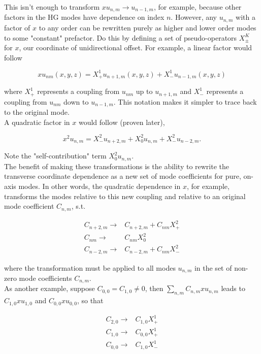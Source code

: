 \documentclass[aps,twoside,secnumarabic,balancelastpage,amsmath,amssymb,nofootinbib,hyperref=pdftex]{revtex4}
\begin{document}
This isn't enough to transform $x u_{n,m} \rightarrow u_{n-1,m}$, for example, because other factors in the HG modes have dependence on index $n$. However, any $u_{n,m}$ with a factor of $x$ to any order can be rewritten purely as higher and lower order modes to some "constant" prefactor. Do this by defining a set of pseudo-operators $X_\pm^K$ for $x$, our coordinate of unidirectional offset. For example, a linear factor would follow

\begin{equation}
x u_{nm} (x,y,z) = 
	X_+^1 u_{n+1,m}(x,y,z)
	+
	X_-^1 u_{n-1,m}(x,y,z) 
\end{equation}

where $X_+^1$ represents a coupling from $u_{nm}$ up to $u_{n+1,m}$ and $X_-^1$ represents a coupling from $u_{nm}$ down to $u_{n-1,m}$. This notation makes it simpler to trace back to the original mode. \\

A quadratic factor in $x$ would follow (proven later),

\begin{equation}
x^2 u_{n, m} =
	X_-^2 u_{n+2,m}
	+
	X_0^2 u_{n,m}
	+
	X_-^2 u_{n-2,m}	.
\end{equation}

Note the "self-contribution" term $X_0^2 u_{n,m}$.\\

The benefit of making these transformations is the ability to rewrite the transverse coordinate dependence as a new set of mode coefficients for pure, on-axis modes. In other words, the quadratic dependence in $x$, for example, transforms the modes relative to this new coupling and relative to an original mode coefficient $C_{n,m}$, s.t. 

\begin{align*}
C_{n+2,m} \rightarrow &C_{n+2,m} + C_{nm}X_+^2
\\
C_{nm} \rightarrow & C_{nm}X_0^2
\\
C_{n-2,m} \rightarrow & C_{n-2,m} + C_{nm}X_-^2
\end{align*}

where the transformation must be applied to all modes $u_{n,m}$ in the set of non-zero mode coefficients $C_{n,m}$.\\

As another example, suppose $C_{0,0}=C_{1,0} \neq 0$, then $\sum_{n,m} C_{n,m} x u_{n,m}$ leads to $C_{1,0} x u_{1,0}$ and $C_{0,0} x  u_{0,0}$, so that

\begin{align*}
C_{2,0} \rightarrow & C_{1,0}X_+^1
\\
C_{1,0} \rightarrow & C_{0,0}X_+^1
\\
C_{0,0} \rightarrow & C_{1,0} X_-^1
\end{align*}
\end{document}
